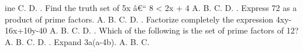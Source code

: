 \documentclass{article}
\begin{document}
\begin{multicols}{2}
ine \indent C. \newline \indent D.  \newline{}. Find the truth set of 5x â€“ 8 < 2x + 4 \newline \indent A. \newline \indent B. \newline \indent C. \newline \indent D.  \newline{}. Express 72 as a product of prime factors. \newline \indent A. \newline \indent B. \newline \indent C. \newline \indent D.  \newline{}. Factorize completely the expression 4xy-16x+10y-40 \newline \indent A. \newline \indent B. \newline \indent C. \newline \indent D.  \newline{}. Which of the following is the set of prime factors of 12? \newline \indent A. \newline \indent B. \newline \indent C. \newline \indent D.  \newline{}. Expand 3a(a-4b). \newline \indent A. \newline \indent B. \newline \indent C. \n
\end{multicols}
\end{document}
